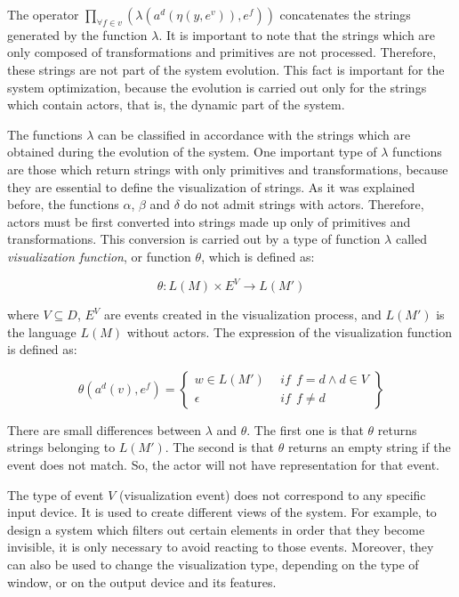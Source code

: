 \documentclass[10pt,journal,letterpaper,compsoc]{IEEEtran}
\begin{document}
The operator $\underset{\forall f \in v}{ \prod }(\lambda (a^d (\eta (y, e^v)), e^f))$ concatenates
the strings generated by the function $\lambda$. It is important to note that the strings which are
only composed of transformations and primitives are not processed. Therefore, these strings are not
part of the system evolution. This fact is important for the system optimization, because the
evolution is carried out only for the strings which contain actors, that is, the dynamic part of
the system.

The functions $\lambda$ can be classified in accordance with the strings which are obtained during
the evolution of the system. One important type of $\lambda$ functions are those which return
strings with only primitives and transformations, because they are essential to define the
visualization of strings. As it was explained before, the functions $\alpha$, $\beta$ and $\delta$ do
not admit strings with actors. Therefore, actors must be first converted into strings made up only
of primitives and transformations. This conversion is carried out by a type of function $\lambda$
called \textit{visualization function}, or function $\theta$, which is defined as:

\begin{equation}
    \theta: L(M) \times E^V \rightarrow L(M')
\end{equation}


where $V \subseteq D$, $E^V$ are events created in the visualization process, and $L(M')$
is the language $L(M)$ without actors. The expression of the visualization function is defined as:


\begin{equation}
    \theta (a^d(v), e^f) =
    \left\{
    \begin{array}{ll}
        w \in L(M') &  \ \ \mathit{if}  \ \ f = d \wedge d \in V \\
        \epsilon  &  \ \ \mathit{if}  \ \ f \neq d
    \end{array}\right\}
\end{equation}



There are small differences between $\lambda$ and $\theta$. The first one is that $\theta$ returns
strings belonging to $L(M')$. The second is that $\theta$ returns an empty string if the event does
not match. So, the actor will not have representation for that event.

The type of event $V$ (visualization event) does not correspond to any specific input device. It is used
to create different views of the system. For example, to design a system which filters
out certain elements in order that they become invisible, it is only necessary to avoid reacting to
those events. Moreover, they can also be used to change the visualization type, depending on the
type of window, or on the output device and its features.
\end{document}
